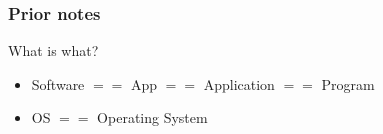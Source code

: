\begin{frame}
\frametitle{Prior notes}

\begin{alertblock}{What is what?}
	\begin{itemize}
		\item Software $==$ App $==$ Application $==$ Program
		\item OS $==$ Operating System
	\end{itemize}
\end{alertblock}

\end{frame}